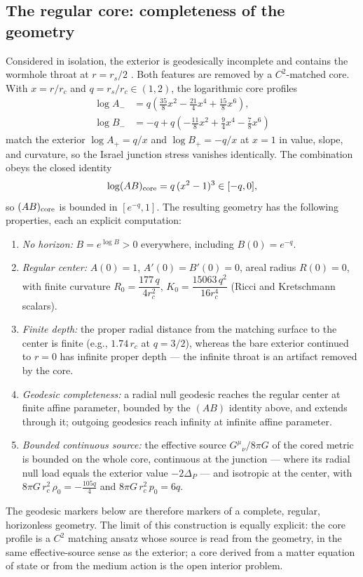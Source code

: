 \documentclass[12pt,a4paper]{article}
\begin{document}
\subsection{The regular core: completeness of the geometry}
\label{sec:core}

Considered in isolation, the exterior is geodesically incomplete and
contains the wormhole throat at $r=r_s/2$ \cite{Boonserm2018}. Both features
are removed by a
$C^2$-matched core. With $x=r/r_c$ and $q=r_s/r_c\in(1,2)$, the logarithmic
core profiles
\begin{align*}
\log A_-&=q\left(\tfrac{35}{8}x^2-\tfrac{21}{4}x^4+\tfrac{15}{8}x^6\right),\\
\log B_-&=-q+q\left(-\tfrac{11}{8}x^2+\tfrac{9}{4}x^4-\tfrac{7}{8}x^6\right)
\end{align*}
match the exterior $\log A_+=q/x$ and $\log B_+=-q/x$ at $x=1$ in value,
slope, and curvature, so the Israel junction stress vanishes identically.
The combination obeys the closed identity
\[
\log(AB)_{\rm core}=q\,(x^2-1)^3\in[-q,0],
\]
so $(AB)_{\rm core}$ is bounded in $[e^{-q},1]$. The resulting geometry has
the following properties, each an explicit computation:
\begin{enumerate}
\item \emph{No horizon:} $B=e^{\log B}>0$ everywhere, including $B(0)=e^{-q}$.
\item \emph{Regular center:} $A(0)=1$, $A'(0)=B'(0)=0$, areal radius
$R(0)=0$, with finite curvature
$R_0=\dfrac{177\,q}{4r_c^2}$,
$K_0=\dfrac{15063\,q^2}{16r_c^4}$ (Ricci and Kretschmann scalars).
\item \emph{Finite depth:} the proper radial distance from the matching
surface to the center is finite (e.g., $1.74\,r_c$ at $q=3/2$), whereas the
bare exterior continued to $r=0$ has infinite proper depth --- the infinite
throat is an artifact removed by the core.
\item \emph{Geodesic completeness:} a radial null geodesic reaches the
regular center at finite affine parameter, bounded by the $(AB)$ identity
above, and extends through it; outgoing geodesics reach infinity at infinite
affine parameter.
\item \emph{Bounded continuous source:} the effective source
$G^\mu{}_\nu/8\pi G$ of the cored metric is bounded on the whole core,
continuous at the junction --- where its radial null load equals the
exterior value $-2\Delta_P$ --- and isotropic at the center, with
$8\pi G\,r_c^2\,\rho_0=-\tfrac{105q}{4}$ and
$8\pi G\,r_c^2\,p_0=6q$.
\end{enumerate}
The geodesic markers below are therefore markers of a complete, regular,
horizonless geometry. The limit of this construction is equally
explicit: the core profile is a $C^2$ matching ansatz whose source is read
from the geometry, in the same effective-source sense as the exterior; a
core derived from a matter equation of state or from the medium action is
the open interior problem.
\end{document}
